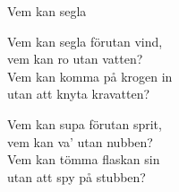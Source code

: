 \begin{song}{Vem kan segla}

    
	
	Vem kan segla förutan vind,\\
	vem kan ro utan vatten?\\
	Vem kan komma på krogen in\\
	utan att knyta kravatten?
	
	Vem kan supa förutan sprit,\\
	vem kan va' utan nubben?\\
	Vem kan tömma flaskan sin\\
	utan att spy på stubben?
	
\end{song}
